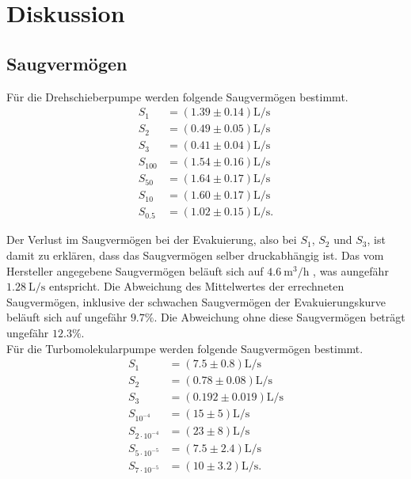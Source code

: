 \section{Diskussion}
\label{sec:Diskussion}

\subsection{Saugvermögen}

Für die Drehschieberpumpe werden folgende Saugvermögen bestimmt.
\begin{align}
    S_1 &= (\num{1.39} \pm \num{0.14}) \si{\liter\per\second} \\
    S_2 &= (\num{0.49} \pm \num{0.05}) \si{\liter\per\second} \\
    S_3 &= (\num{0.41} \pm \num{0.04}) \si{\liter\per\second} \\
    S_{100} &= (\num{1.54} \pm \num{0.16}) \si{\liter\per\second} \\
    S_{50} &= (\num{1.64} \pm \num{0.17}) \si{\liter\per\second} \\
    S_{10} &= (\num{1.60} \pm \num{0.17}) \si{\liter\per\second} \\
    S_{\num{0.5}} &= (\num{1.02} \pm \num{0.15}) \si{\liter\per\second}.
\end{align}

Der Verlust im Saugvermögen bei der Evakuierung, also bei $S_1$, $S_2$ und $S_3$, ist damit zu erklären, dass das Saugvermögen selber druckabhängig ist.
Das vom Hersteller angegebene Saugvermögen beläuft sich auf $\SI{4.6}{\meter\cubed\per\hour}$ \cite{delta_tu_dortmund}, was aungefähr $\SI{1.28}{\liter\per\second}$ entspricht.
Die Abweichung des Mittelwertes der errechneten Saugvermögen,  inklusive der schwachen Saugvermögen der Evakuierungskurve beläuft sich auf ungefähr $\num{9.7}\%$.
Die Abweichung ohne diese Saugvermögen beträgt ungefähr $\num{12.3}\%$. \\


Für die Turbomolekularpumpe werden folgende Saugvermögen bestimmt.
\begin{align}
    S_1 &= (\num{7.5} \pm \num{0.8}) \si{\liter\per\second} \\
    S_2 &= (\num{0.78} \pm \num{0.08}) \si{\liter\per\second} \\
    S_3 &= (\num{0.192} \pm \num{0.019}) \si{\liter\per\second} \\
    S_{10^{-4}} &= (\num{15} \pm \num{5}) \si{\liter\per\second} \\
    S_{2 \cdot 10^{-4}} &= (\num{23} \pm \num{8}) \si{\liter\per\second} \\
    S_{5 \cdot 10^{-5}} &= (\num{7.5} \pm \num{2.4}) \si{\liter\per\second}\\
    S_{7 \cdot 10^{-5}} &= (\num{10} \pm \num{3.2}) \si{\liter\per\second}.
\end{align}

